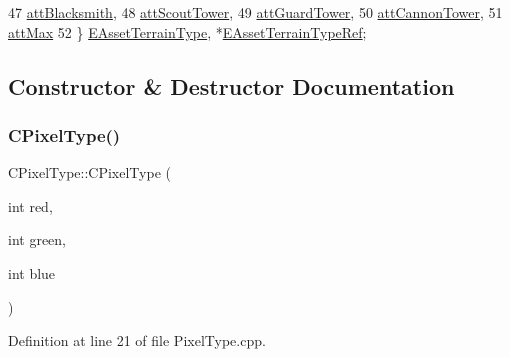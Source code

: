 \begin{DoxyCode}
47             \hyperlink{classCPixelType_af06457fd1c2ff34c67ce670e633a10b0aeecaed906b245b7ff44b4d6a55345d52}{attBlacksmith},
48             \hyperlink{classCPixelType_af06457fd1c2ff34c67ce670e633a10b0a734772bfa3f575ca8811485873e2478b}{attScoutTower},
49             \hyperlink{classCPixelType_af06457fd1c2ff34c67ce670e633a10b0ab5afa80bf72a1e1fd366490591794229}{attGuardTower},
50             \hyperlink{classCPixelType_af06457fd1c2ff34c67ce670e633a10b0a9220629e324fc6cfb6eb9e0f9853354c}{attCannonTower},
51             \hyperlink{classCPixelType_af06457fd1c2ff34c67ce670e633a10b0aba7dc66927790d80f52e095181fdd8f3}{attMax}
52         \} \hyperlink{classCPixelType_af06457fd1c2ff34c67ce670e633a10b0}{EAssetTerrainType}, *\hyperlink{classCPixelType_aa7603ccb4887263fd6f78d5e84124bae}{EAssetTerrainTypeRef};
\end{DoxyCode}


\subsection{Constructor \& Destructor Documentation}
\hypertarget{classCPixelType_a393381dca7114d6279bcee1e5f280e4b}{}\label{classCPixelType_a393381dca7114d6279bcee1e5f280e4b} 
\subsubsection{\texorpdfstring{C\+Pixel\+Type()}{CPixelType()}\hspace{0.1cm}{\footnotesize\ttfamily [1/4]}}
{\footnotesize\ttfamily C\+Pixel\+Type\+::\+C\+Pixel\+Type (\begin{DoxyParamCaption}\item[{int}]{red,  }\item[{int}]{green,  }\item[{int}]{blue }\end{DoxyParamCaption})}



Definition at line 21 of file Pixel\+Type.\+cpp.


